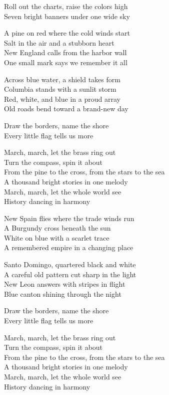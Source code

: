 \begin{lyrics}
Roll out the charts, raise the colors high\\
Seven bright banners under one wide sky

A pine on red where the cold winds start\\
Salt in the air and a stubborn heart\\
New England calls from the harbor wall\\
One small mark says we remember it all

Across blue water, a shield takes form\\
Columbia stands with a sunlit storm\\
Red, white, and blue in a proud array\\
Old roads bend toward a brand-new day

Draw the borders, name the shore\\
Every little flag tells us more

March, march, let the brass ring out\\
Turn the compass, spin it about\\
From the pine to the cross, from the stars to the sea\\
A thousand bright stories in one melody\\
March, march, let the whole world see\\
History dancing in harmony

New Spain flies where the trade winds run\\
A Burgundy cross beneath the sun\\
White on blue with a scarlet trace\\
A remembered empire in a changing place

Santo Domingo, quartered black and white\\
A careful old pattern cut sharp in the light\\
New Leon answers with stripes in flight\\
Blue canton shining through the night

Draw the borders, name the shore\\
Every little flag tells us more

March, march, let the brass ring out\\
Turn the compass, spin it about\\
From the pine to the cross, from the stars to the sea\\
A thousand bright stories in one melody\\
March, march, let the whole world see\\
History dancing in harmony


\end{lyrics}

